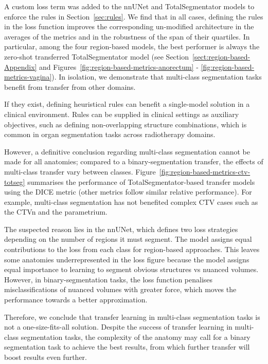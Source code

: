 \documentclass[11pt,twoside]{report}
\begin{document}
\begin{minipage}[c]{.55\linewidth}

    A custom loss term was added to the nnUNet and TotalSegmentator models to enforce the rules in Section~\ref{sec:rules}. We find that in all cases, defining the rules in the loss function improves the corresponding un-modified architecture in the averages of the metrics and in the robustness of the span of their quartiles. In particular, among the four region-based models, the best performer is always the zero-shot transferred TotalSegmentator model (see Section~\ref{sect:region-based-Appendix} and Figures~\ref{fig:region-based-metrics-anorectum} - \ref{fig:region-based-metrics-vagina}). In isolation, we demonstrate that multi-class segmentation tasks benefit from transfer from other domains.
    
    \vspace{1em}

    If they exist, defining heuristical rules can benefit a single-model solution in a clinical environment. Rules can be supplied in clinical settings as auxiliary objectives, such as defining non-overlapping structure combinations, which is common in organ segmentation tasks across radiotherapy domains.

    \vspace{1em}

    However, a definitive conclusion regarding multi-class segmentation cannot be made for all anatomies; compared to a binary-segmentation transfer, the effects of multi-class transfer vary between classes. Figure~\ref{fig:region-based-metrics-ctv-totseg} summarises the performance of TotalSegmentator-based transfer models using the DICE metric (other metrics follow similar relative performance). For example, multi-class segmentation has not benefited complex CTV cases such as the CTVn and the parametrium. 

    \vspace{1em}

    The suspected reason lies in the nnUNet, which defines two loss strategies depending on the number of regions it must segment. The model assigns equal contributions to the loss from each class for region-based approaches. This leaves some anatomies underrepresented in the loss figure because the model assigns equal importance to learning to segment obvious structures vs nuanced volumes. However, in binary-segmentation tasks, the loss function penalises misclassifications of nuanced volumes with greater force, which moves the performance towards a better approximation.

    \vspace{1em}

    Therefore, we conclude that transfer learning in multi-class segmentation tasks is not a one-size-fits-all solution. Despite the success of transfer learning in multi-class segmentation tasks, the complexity of the anatomy may call for a binary segmentation task to achieve the best results, from which further transfer will boost results even further.

\end{minipage}%
\end{document}
